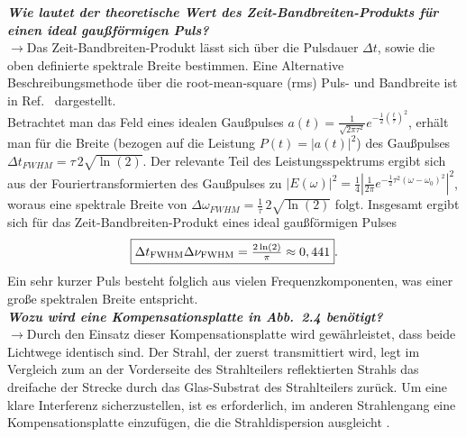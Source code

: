 \textbf{\textit{Wie lautet der theoretische Wert des Zeit-Bandbreiten-Produkts für
einen ideal gaußförmigen Puls?}}\\
$\rightarrow$Das Zeit-Bandbreiten-Produkt lässt sich über die Pulsdauer $\Delta t$, sowie die 
oben definierte spektrale Breite bestimmen. 
Eine Alternative Beschreibungsmethode über die root-mean-square (rms) Puls- und Bandbreite 
ist in Ref.~\cite{UltraFast} dargestellt. \\
Betrachtet man das Feld eines idealen Gaußpulses 
$a(t)=\frac{1}{\sqrt{2\pi \tau^{2}}}e^{-\frac{1}{2}(\frac{t}{\tau})^{2}}$, erhält man für die 
Breite (bezogen auf die Leistung $P(t)=|a(t)|^{2}$) des Gaußpulses $\Delta t_{FWHM} = \tau\,2\sqrt{\ln(2)}$. 
Der relevante Teil des Leistungsspektrums ergibt sich aus der Fouriertransformierten des Gaußpulses zu 
$|E(\omega)|^{2} = \frac{1}{4}\left\vert\frac{1}{2\pi}e^{-\frac{1}{2}\tau^{2}(\omega-\omega_{0})^{2}}\right\vert^{2}$, woraus 
eine spektrale Breite von $\Delta \omega_{FWHM} = \frac{1}{\tau}\,2\sqrt{\ln(2)}$ folgt.
Insgesamt ergibt sich für das Zeit-Bandbreiten-Produkt eines ideal gaußförmigen Pulses
\begin{equation}
    \fbox{$\Delta t_{\text{FWHM}}\Delta \nu_{\text{FWHM}} = \frac{2\ln(2)}{\pi} \approx 0,441$}.
\end{equation}
Ein sehr kurzer Puls besteht folglich aus vielen Frequenzkomponenten, was einer große spektralen 
Breite entspricht. \\

\textbf{\textit{Wozu wird eine Kompensationsplatte in Abb.~2.4 benötigt?}}\\
$\rightarrow$Durch den Einsatz dieser Kompensationsplatte wird gewährleistet, dass beide Lichtwege 
identisch sind. Der Strahl, der zuerst transmittiert wird, legt im Vergleich zum an der Vorderseite 
des Strahlteilers reflektierten Strahls das dreifache der Strecke durch das Glas-Substrat des Strahlteilers zurück. 
Um eine klare Interferenz sicherzustellen, ist es erforderlich, im anderen Strahlengang eine 
Kompensationsplatte einzufügen, die die Strahldispersion ausgleicht \cite{OpticsHand}.

